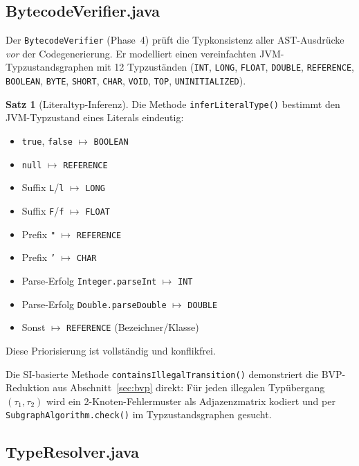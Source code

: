 ﻿\documentclass[a4paper,12pt]{article}
\theoremstyle{definition}
\newtheorem{satz}{Satz}
\begin{document}
\subsection{BytecodeVerifier.java}

Der \texttt{BytecodeVerifier} (Phase~4) pr\"uft die
Typkonsistenz aller AST-Ausdr\"ucke \emph{vor} der
Codegenerierung.  Er modelliert einen vereinfachten
JVM-Typzustandsgraphen mit 12 Typzust\"anden
(\texttt{INT}, \texttt{LONG}, \texttt{FLOAT}, \texttt{DOUBLE},
\texttt{REFERENCE}, \texttt{BOOLEAN}, \texttt{BYTE},
\texttt{SHORT}, \texttt{CHAR}, \texttt{VOID},
\texttt{TOP}, \texttt{UNINITIALIZED}).

\begin{satz}[Literaltyp-Inferenz]
\label{satz:litinfer}
Die Methode \texttt{inferLiteralType()} bestimmt den
JVM-Typzustand eines Literals eindeutig:
\begin{itemize}
    \item \texttt{true}, \texttt{false} $\mapsto$ \texttt{BOOLEAN}
    \item \texttt{null} $\mapsto$ \texttt{REFERENCE}
    \item Suffix \texttt{L}/\texttt{l} $\mapsto$ \texttt{LONG}
    \item Suffix \texttt{F}/\texttt{f} $\mapsto$ \texttt{FLOAT}
    \item Prefix \texttt{"} $\mapsto$ \texttt{REFERENCE}
    \item Prefix \texttt{'} $\mapsto$ \texttt{CHAR}
    \item Parse-Erfolg \texttt{Integer.parseInt} $\mapsto$ \texttt{INT}
    \item Parse-Erfolg \texttt{Double.parseDouble} $\mapsto$ \texttt{DOUBLE}
    \item Sonst $\mapsto$ \texttt{REFERENCE} (Bezeichner/Klasse)
\end{itemize}
Diese Priorisierung ist vollst\"andig und konflikfrei.
\end{satz}

Die SI-basierte Methode \texttt{containsIllegalTransition()}
demonstriert die BVP-Reduktion aus Abschnitt~\ref{sec:bvp}
direkt: F\"ur jeden illegalen Typ\"ubergang $(\tau_1, \tau_2)$
wird ein 2-Knoten-Fehlermuster als Adjazenzmatrix kodiert
und per \texttt{SubgraphAlgorithm.check()} im
Typzustandsgraphen gesucht.

\subsection{TypeResolver.java}
\end{document}
